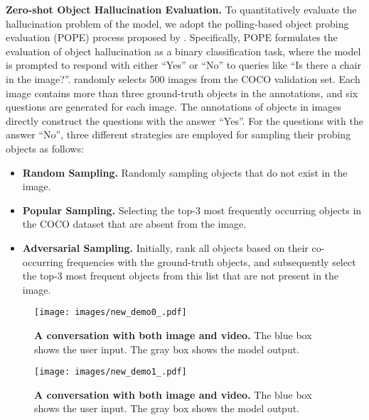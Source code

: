 \documentclass[10pt,twocolumn,letterpaper]{article}
\newcommand{\myparagraph}[1]{\textbf{#1}\hspace{1.8ex}}
\begin{document}
\noindent \myparagraph{Zero-shot Object Hallucination Evaluation.}
To quantitatively evaluate the hallucination problem of the model, we adopt the polling-based object probing evaluation (POPE) process proposed by \citet{li2023evaluating}. Specifically, POPE formulates the evaluation of object hallucination as a binary classification task, where the model is prompted to respond with either ``Yes'' or ``No'' to queries like ``Is there a chair in the image?''. \citet{li2023evaluating} randomly selects 500 images from the COCO validation set. Each image contains more than three ground-truth objects in the annotations, and six questions are generated for each image. The annotations of objects in images directly construct the questions with the answer ``Yes''. For the questions with the answer ``No'', three different strategies are employed for sampling their probing objects as follows:

\begin{itemize}
\item \textbf{Random Sampling.} Randomly sampling objects that do not exist in the image.

\item \textbf{Popular Sampling.} Selecting the top-3 most frequently occurring objects in the COCO dataset that are absent from the image.

\item \textbf{Adversarial Sampling.} Initially, \citet{li2023evaluating} rank all objects based on their co-occurring frequencies with the ground-truth objects, and subsequently select the top-3 most frequent objects from this list that are not present in the image.

\end{itemize}


\begin{figure*}[tbp]
\centering
\texttt{[image: images/new\_demo0\_.pdf]}
\caption{\textbf{A conversation with both image and video.} The blue box shows the user input. The gray box shows the model output.}
\label{fig:appendix_demo0}
\end{figure*}

\begin{figure*}[tbp]
\centering
\texttt{[image: images/new\_demo1\_.pdf]}
\caption{\textbf{A conversation with both image and video.} The blue box shows the user input. The gray box shows the model output.}
\label{fig:appendix_demo1}
\end{figure*}
\end{document}

